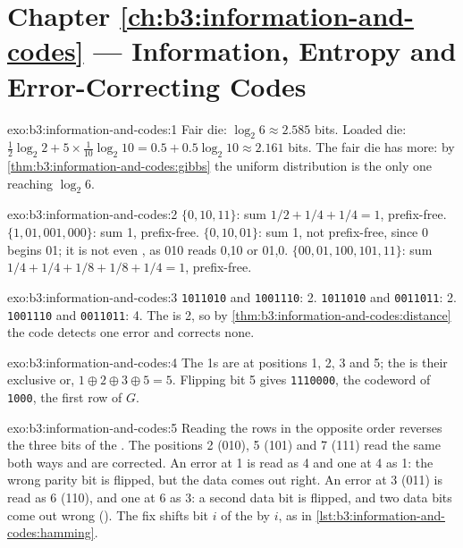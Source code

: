 \section*{Chapter \ref{ch:b3:information-and-codes} --- Information, Entropy and Error-Correcting Codes}

\begin{solution}{exo:b3:information-and-codes:1}
Fair die: $\log_2 6 \approx 2.585$ bits. Loaded die: $\frac12 \log_2 2 + 5 \times \frac{1}{10} \log_2 10 = 0.5 + 0.5 \log_2 10 \approx 2.161$ bits. The fair die has more: by \cref{thm:b3:information-and-codes:gibbs} the uniform distribution is the only one reaching $\log_2 6$.
\end{solution}

\begin{solution}{exo:b3:information-and-codes:2}
$\{0, 10, 11\}$: sum $1/2 + 1/4 + 1/4 = 1$, prefix-free. $\{1, 01, 001, 000\}$: sum 1, prefix-free. $\{0, 10, 01\}$: sum 1, not prefix-free, since 0 begins 01; it is not even , as 010 reads 0,10 or 01,0. $\{00, 01, 100, 101, 11\}$: sum $1/4 + 1/4 + 1/8 + 1/8 + 1/4 = 1$, prefix-free.
\end{solution}

\begin{solution}{exo:b3:information-and-codes:3}
\texttt{1011010} and \texttt{1001110}: 2. \texttt{1011010} and \texttt{0011011}: 2. \texttt{1001110} and \texttt{0011011}: 4. The  is 2, so by \cref{thm:b3:information-and-codes:distance} the code detects one error and corrects none.
\end{solution}

\begin{solution}{exo:b3:information-and-codes:4}
The 1s are at positions 1, 2, 3 and 5; the  is their exclusive or, $1 \oplus 2 \oplus 3 \oplus 5 = 5$. Flipping bit 5 gives \texttt{1110000}, the codeword of \texttt{1000}, the first row of $G$.
\end{solution}

\begin{solution}{exo:b3:information-and-codes:5}
Reading the rows in the opposite order reverses the three bits of the . The positions 2 (010), 5 (101) and 7 (111) read the same both ways and are corrected. An error at 1 is read as 4 and one at 4 as 1: the wrong parity bit is flipped, but the data comes out right. An error at 3 (011) is read as 6 (110), and one at 6 as 3: a second data bit is flipped, and two data bits come out wrong (). The fix shifts bit $i$ of the  by $i$, as in \cref{lst:b3:information-and-codes:hamming}.
\end{solution}

